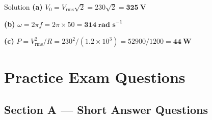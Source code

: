 \begin{examplebox}{Solution}
\textbf{(a)} \quad $V_0 = V_{\text{rms}}\sqrt{2} = 230\sqrt{2} = \mathbf{325\ \text{V}}$

\vspace{0.3em}
\textbf{(b)} \quad $\omega = 2\pi f = 2\pi\times50 = \mathbf{314\ \text{rad s}^{-1}}$

\vspace{0.3em}
\textbf{(c)} \quad $P = V_{\text{rms}}^2/R = 230^2/(1.2\times10^3) = 52900/1200 = \mathbf{44\ \text{W}}$
\end{examplebox}

\section{Practice Exam Questions}

\subsection*{Section A — Short Answer Questions}

